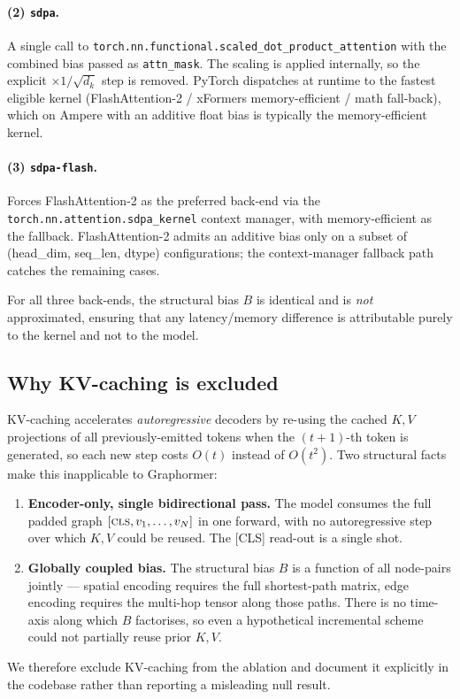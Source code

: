 \documentclass[11pt]{article}
\begin{document}
\paragraph{(2) \texttt{sdpa}.} A single call to
\texttt{torch.nn.functional.scaled\_dot\_product\_attention} with the
combined bias passed as \texttt{attn\_mask}. The scaling is applied
internally, so the explicit \texttt{$\times 1/\sqrt{d_k}$} step is
removed. PyTorch dispatches at runtime to the fastest eligible kernel
(FlashAttention-2 / xFormers memory-efficient / math fall-back), which
on Ampere with an additive float bias is typically the
memory-efficient kernel.

\paragraph{(3) \texttt{sdpa-flash}.} Forces FlashAttention-2 as the
preferred back-end via the \texttt{torch.nn.attention.sdpa\_kernel}
context manager, with memory-efficient as the fallback. FlashAttention-2
admits an additive bias only on a subset of (head\_dim, seq\_len, dtype)
configurations; the context-manager fallback path catches the remaining
cases.

For all three back-ends, the structural bias $B$ is identical and is
\emph{not} approximated, ensuring that any latency/memory difference is
attributable purely to the kernel and not to the model.

\subsection{Why KV-caching is excluded}
\label{sec:nokv}

KV-caching accelerates \emph{autoregressive} decoders by re-using the
cached $K, V$ projections of all previously-emitted tokens when the
$(t{+}1)$-th token is generated, so each new step costs $O(t)$ instead of
$O(t^2)$. Two structural facts make this inapplicable to Graphormer:
\begin{enumerate}
    \item \textbf{Encoder-only, single bidirectional pass.} The model
        consumes the full padded graph $[\textsc{cls}, v_1, \dots, v_N]$
        in one forward, with no autoregressive step over which $K,V$
        could be reused. The [CLS] read-out is a single shot.
    \item \textbf{Globally coupled bias.} The structural bias $B$ is a
        function of all node-pairs jointly --- spatial encoding requires
        the full shortest-path matrix, edge encoding requires the
        multi-hop tensor along those paths. There is no time-axis along
        which $B$ factorises, so even a hypothetical incremental scheme
        could not partially reuse prior $K,V$.
\end{enumerate}
We therefore exclude KV-caching from the ablation and document it
explicitly in the codebase rather than reporting a misleading null
result.
\end{document}
